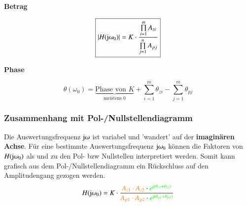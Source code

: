 \vspace{0.2cm}
\begin{minipage}[t]{0.48\columnwidth}
    \begin{center}
        \textbf{Betrag}
    \end{center}
    \vspace{-0.2cm}
    $$ \boxed{ | H(\mathrm{j} \omega_0) | = K \cdot \frac{\prod\limits_{i=1}^{m} A_{zi}}{\prod\limits_{j=1}^{n} A_{pj}} } $$
\end{minipage}
\hfill
\begin{minipage}[t]{0.48\columnwidth}
    \begin{center}
        \textbf{Phase}
    \end{center}
    \vspace{-0.2cm}
    $$ \boxed{ \theta(\omega_0) = \underbrace{\text{Phase von } K}_{\text{meistens } 0} + \sum_{i=1}^{m} \theta_{zi} - \sum_{j=1}^{m} \theta_{pj} } $$
\end{minipage}


\subsubsection{Zusammenhang mit Pol-/Nullstellendiagramm}

\begin{minipage}[c]{0.5\columnwidth}
    
\end{minipage}
\hfill
\begin{minipage}[c]{0.48\columnwidth}
    Die Auswertungsfrequenz $\mathrm{j} \omega$ ist variabel und 'wandert' auf der \textbf{imaginären Achse}.
    Für eine bestimmte Auswertungsfrequenz $\mathrm{j} \omega_0$ können die Faktoren von $H(\mathrm{j} \omega_0)$ als 
    und  zu den Pol- bzw Nullstellen interpretiert werden.
    Somit kann grafisch aus dem Pol-/Nullstellendiagramm ein Rückschluss auf den Amplitudengang gezogen werden.
    $$ H(\mathrm{j} \omega_0) = K \cdot \frac{{\color{orange}A_{z1} \cdot A_{z2}} \cdot {\color{green}e^{\ensuremath{\mathrm{j}}(\theta_{z1} + \theta_{z2})}}}
    {{\color{orange}A_{p1} \cdot A_{p2}} \cdot {\color{green}e^{\ensuremath{\mathrm{j}}(\theta_{p1} + \theta_{p2})}}}  $$
\end{minipage}



